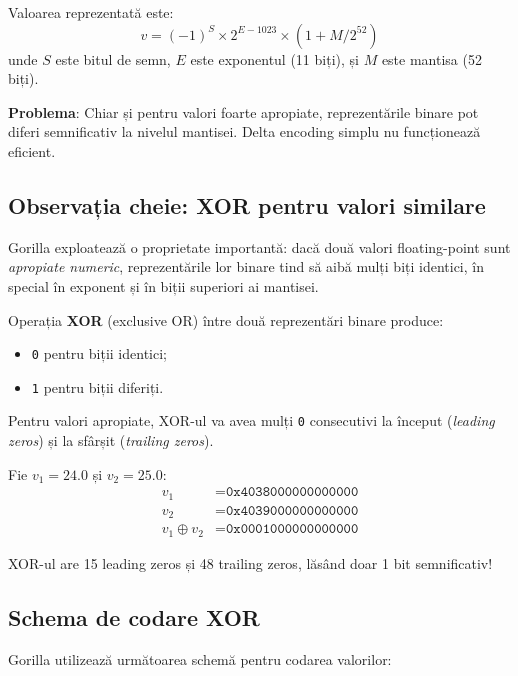 Valoarea reprezentată este:
\begin{equation}
    v = (-1)^S \times 2^{E-1023} \times (1 + M/2^{52})
\end{equation}
unde $S$ este bitul de semn, $E$ este exponentul (11 biți), și $M$ este mantisa (52 biți).

\textbf{Problema}: Chiar și pentru valori foarte apropiate, reprezentările binare pot diferi semnificativ la nivelul mantisei. Delta encoding simplu nu funcționează eficient.

\subsection{Observația cheie: XOR pentru valori similare}

Gorilla exploatează o proprietate importantă: dacă două valori floating-point sunt \textit{apropiate numeric}, reprezentările lor binare tind să aibă mulți biți identici, în special în exponent și în biții superiori ai mantisei.

Operația \textbf{XOR} (exclusive OR) între două reprezentări binare produce:
\begin{itemize}
    \item \texttt{0} pentru biții identici;
    \item \texttt{1} pentru biții diferiți.
\end{itemize}

Pentru valori apropiate, XOR-ul va avea mulți \texttt{0} consecutivi la început (\textit{leading zeros}) și la sfârșit (\textit{trailing zeros}).

\begin{example}
Fie $v_1 = 24.0$ și $v_2 = 25.0$:
\begin{align*}
    v_1 &= \texttt{0x4038000000000000} \\
    v_2 &= \texttt{0x4039000000000000} \\
    v_1 \oplus v_2 &= \texttt{0x0001000000000000}
\end{align*}

XOR-ul are 15 leading zeros și 48 trailing zeros, lăsând doar 1 bit semnificativ!
\end{example}

\subsection{Schema de codare XOR}

Gorilla utilizează următoarea schemă pentru codarea valorilor:

